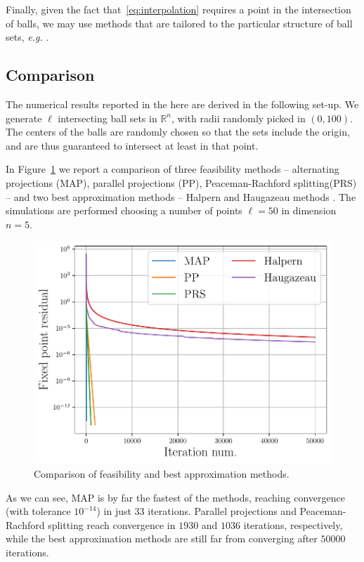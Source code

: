 \documentclass{article}
\newcommand{\R}{\mathbb{R}}
\begin{document}
Finally, given the fact that~\eqref{eq:interpolation} requires a point in the intersection of balls, we may use methods that are tailored to the particular structure of ball sets, \emph{e.g.} \cite{lushchakova_geometric_2020}.

\subsection{Comparison}
The numerical results reported in the here are derived in the following set-up. We generate $\ell$ intersecting ball sets in $\R^n$, with radii randomly picked in $(0, 100)$. The centers of the balls are randomly chosen so that the sets include the origin, and are thus guaranteed to intersect at least in that point.

In Figure~\ref{fig:projection_methods} we report a comparison of three feasibility methods -- alternating projections (MAP), parallel projections (PP), Peaceman-Rachford splitting(PRS) \cite{reich_projection_2015,bauschke_convex_2017} -- and two best approximation methods -- Halpern and Haugazeau methods \cite{bauschke_convex_2017}. The simulations are performed choosing a number of points $\ell = 50$ in dimension $n = 5$.

\begin{figure}[!ht]
\centering
\includegraphics[width = 0.9\columnwidth]{Figures/comparison_projection_methods}
\caption{Comparison of feasibility and best approximation methods.}
\label{fig:projection_methods}
\end{figure}

As we can see, MAP is by far the fastest of the methods, reaching convergence (with tolerance $10^{-14}$) in just $33$ iterations. Parallel projections and Peaceman-Rachford splitting reach convergence in $1930$ and $1036$ iterations, respectively, while the best approximation methods are still far from converging after $50000$ iterations.
\end{document}
